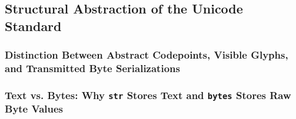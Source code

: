 \subsection{Structural Abstraction of the Unicode Standard}
\subsubsection{Distinction Between Abstract Codepoints, Visible Glyphs, and Transmitted Byte Serializations}
\subsubsection{Text vs. Bytes: Why \texttt{str} Stores Text and \texttt{bytes} Stores Raw Byte Values}
